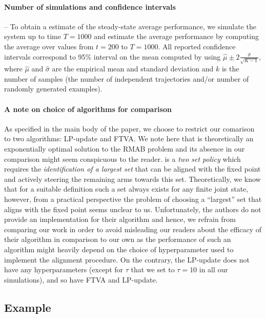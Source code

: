 \paragraph{Number of simulations and confidence intervals} --  To obtain a estimate of the steady-state average performance, we simulate the system up to time $T=1000$ and estimate the average performance by computing the average over values from $t=200$ to $T=1000$.  All reported confidence intervals correspond to 95\% interval on the mean computed by using $\hat{\mu}\pm 2\frac{\hat{\sigma}}{\sqrt{K-1}}$, where $\hat{\mu}$ and $\hat{\sigma}$ are the empirical mean and standard deviation and $k$ is the number of samples (the number of independent trajectories and/or number of randomly generated examples).


\paragraph{A note on choice of algorithms for comparison} As specified in the main body of the paper, we choose to restrict our comarison to two algorithms: LP-update and FTVA.  We note here that \citet{HXCW24} is theoretically an exponentially optimal solution to the RMAB problem and its absence in our comparison might seem conspicuous to the reader. \citet{HXCW24} is a \textit{two set policy} which requires the \emph{identification of a largest set} that can be aligned with the fixed point and actively steering the remaining arms towards this set. Theoretically, we know that for a suitable definition such a set always exists for any finite joint state, however, from a practical perspective the problem of choosing a ``largest'' set that aligns with the fixed point seems unclear to us. Unfortunately, the authors do not provide an implementation for their algorithm and hence, we refrain from comparing our work in order to avoid misleading our readers about the efficacy of their algorithm in comparison to our own as the performance of such an algorithm might heavily depend on the choice of hyperparameter used to implement the alignment procedure. On the contrary, the LP-update does not have any hyperparameters (except for $\tau$ that we set to $\tau=10$ in all our simulations), and so have FTVA and LP-update.


\subsection{Example \cite{HXCW23}}

